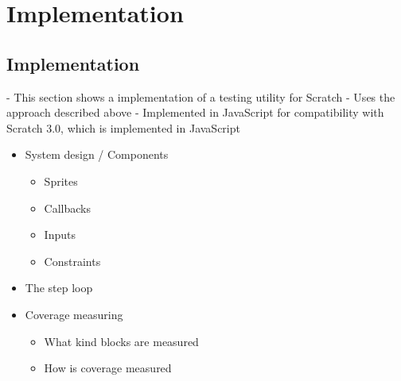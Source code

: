 \chapter{Implementation}

\section{Implementation}
- This section shows a implementation of a testing utility for Scratch
- Uses the approach described above
- Implemented in JavaScript for compatibility with Scratch 3.0, which is implemented in JavaScript

\begin{itemize}
    \item System design / Components
        \begin{itemize}
            \item Sprites
            \item Callbacks
            \item Inputs
            \item Constraints
        \end{itemize}
    \item The step loop
    \item Coverage measuring
        \begin{itemize}
            \item What kind blocks are measured
            \item How is coverage measured
        \end{itemize}
\end{itemize}

